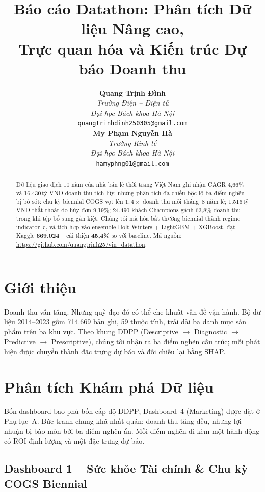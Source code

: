 \documentclass{article}
\title{Báo cáo Datathon: Phân tích Dữ liệu Nâng cao,\\
       Trực quan hóa và Kiến trúc Dự báo Doanh thu}
\author{%
  \begin{minipage}[t]{0.48\textwidth}
    \centering
    \textbf{Quang Trịnh Đình} \\
    \small
    \textit{Trường Điện -- Điện tử}\\
    \textit{Đại học Bách khoa Hà Nội}\\
    \texttt{quangtrinhdinh250305@gmail.com}
  \end{minipage}
  \hfill
  \begin{minipage}[t]{0.48\textwidth}
    \centering
    \textbf{My Phạm Nguyễn Hà} \\
    \small
    \textit{Trường Kinh tế }\\
    \textit{Đại học Bách khoa Hà Nội}\\
    \texttt{hamyphng01@gmail.com}
  \end{minipage}
}
\begin{document}
\linenumbers  %
\raggedbottom
\maketitle

\begin{abstract}
Dữ liệu giao dịch 10 năm của nhà bán lẻ thời trang Việt Nam ghi nhận CAGR 4,66\%
và 16.430\,tỷ VNĐ doanh thu tích lũy, nhưng phân tích đa chiều bộc lộ ba điểm
nghẽn bị bỏ sót: chu kỳ biennial COGS vọt lên $1{,}4\times$ doanh thu mỗi tháng~8
năm lẻ; 1.516\,tỷ VNĐ thất thoát do hủy đơn 9,19\%; 24.490 khách Champions gánh
63,8\% doanh thu trong khi tệp bổ sung gần kiệt. Chúng tôi mã hóa bất thường
biennial thành regime indicator~$r_t$ và tích hợp vào ensemble Holt-Winters +
LightGBM + XGBoost, đạt Kaggle \textbf{669.024} -- cải thiện \textbf{45,4\%} so
với baseline. Mã nguồn: \url{https://github.com/quangtrinh25/vin_datathon}.
\end{abstract}

\section{Giới thiệu}
\label{sec:intro}

Doanh thu vẫn tăng. Nhưng quỹ đạo đó có thể che khuất vấn đề vận hành. Bộ dữ
liệu 2014--2023 gồm 714.669 bản ghi, 59 thuộc tính, trải dài ba danh mục sản
phẩm trên ba khu vực. Theo khung DDPP (Descriptive $\to$ Diagnostic $\to$
Predictive $\to$ Prescriptive), chúng tôi nhận ra ba điểm nghẽn cấu trúc; mỗi
phát hiện được chuyển thành đặc trưng dự báo và đối chiếu lại bằng SHAP.

\section{Phân tích Khám phá Dữ liệu}
\label{sec:eda}

Bốn dashboard bao phủ bốn cấp độ DDPP; Dashboard~4 (Marketing) được đặt ở Phụ
lục~A. Bức tranh chung khá nhất quán: doanh thu tăng đều, nhưng lợi
nhuận bị bào mòn bởi ba điểm nghẽn ẩn. Mỗi điểm nghẽn đi kèm một hành động có
ROI định lượng và một đặc trưng dự báo.

\subsection{Dashboard 1 -- Sức khỏe Tài chính \& Chu kỳ COGS Biennial}
\label{sec:d1}
\end{document}
